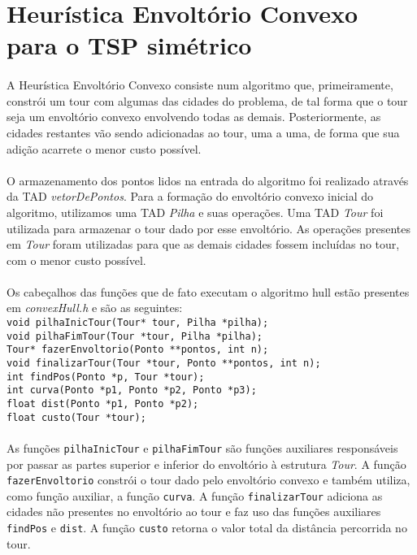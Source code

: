 \documentclass[12pt,a4paper]{article}
\begin{document}
 \section{Heurística Envoltório Convexo para o TSP simétrico}
 {\paragraph{} A Heurística Envoltório Convexo consiste num algoritmo que, primeiramente, constrói um tour com algumas das cidades 
 do problema, de tal forma que o tour seja um envoltório convexo envolvendo todas as demais. Posteriormente, as cidades restantes 
 vão sendo adicionadas ao tour, uma a uma, de forma que sua adição acarrete o menor custo possível.}
 {\paragraph{} O armazenamento dos pontos lidos na entrada do algoritmo foi realizado através da TAD \emph{vetorDePontos}. 
 Para a formação do envoltório convexo inicial do algoritmo, utilizamos uma TAD \emph{Pilha} e suas operações. Uma TAD 
 \emph{Tour} foi utilizada para armazenar o tour dado por esse envoltório. As operações presentes em \emph{Tour} foram utilizadas
 para que as demais cidades fossem incluídas no tour, com o menor custo possível.}
 {\paragraph{} Os cabeçalhos das funções que de fato executam o algoritmo hull estão presentes em \emph{convexHull.h} e são as
 seguintes:\\
 {\tt void pilhaInicTour(Tour* tour, Pilha *pilha);}\\
 {\tt void pilhaFimTour(Tour *tour, Pilha *pilha);}\\
 {\tt Tour* fazerEnvoltorio(Ponto **pontos, int n);}\\
 {\tt void finalizarTour(Tour *tour, Ponto **pontos, int n);}\\
 {\tt int findPos(Ponto *p, Tour *tour);}\\
 {\tt int curva(Ponto *p1, Ponto *p2, Ponto *p3);}\\
 {\tt float dist(Ponto *p1, Ponto *p2);}\\
 {\tt float custo(Tour *tour);}}
 {\paragraph{} As funções {\tt pilhaInicTour} e {\tt pilhaFimTour} são funções auxiliares responsáveis por passar as partes superior
 e inferior do envoltório à estrutura \emph{Tour}. A função {\tt fazerEnvoltorio} constrói o tour dado pelo envoltório convexo 
 e também utiliza, como função auxiliar, a função {\tt curva}. A função {\tt finalizarTour} adiciona as cidades não presentes
 no envoltório ao tour e faz uso das funções auxiliares {\tt findPos} e {\tt dist}. A função {\tt custo} retorna o valor total
 da distância percorrida no tour.}
\end{document}
